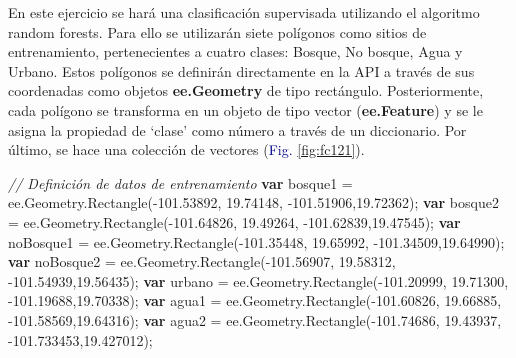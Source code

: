 \documentclass[
  12pt,
  letterpaper,
  twoside]{book}
\newenvironment{Shaded}{\begin{snugshade}}{\end{snugshade}}
\newcommand{\AttributeTok}[1]{\textcolor[rgb]{0.48,0.12,0.64}{#1}}
\newcommand{\CommentTok}[1]{\textcolor[rgb]{0.24,0.58,0.00}{\textit{#1}}}
\newcommand{\ControlFlowTok}[1]{\textcolor[rgb]{0.00,0.00,0.00}{\textbf{#1}}}
\newcommand{\FloatTok}[1]{\textcolor[rgb]{0.28,0.53,0.93}{#1}}
\newcommand{\FunctionTok}[1]{\textcolor[rgb]{0.48,0.12,0.64}{#1}}
\newcommand{\KeywordTok}[1]{\textcolor[rgb]{0.48,0.12,0.64}{#1}}
\newcommand{\NormalTok}[1]{#1}
\newcommand{\OperatorTok}[1]{\textcolor[rgb]{0.00,0.00,0.00}{#1}}
\newcommand\boldpurple[1]{\textcolor{darkpurple}{\textbf{#1}}}
\begin{document}
En este ejercicio se hará una clasificación supervisada utilizando el algoritmo random forests. Para ello se utilizarán siete polígonos como sitios de entrenamiento, pertenecientes a cuatro clases: Bosque, No bosque, Agua y Urbano. Estos polígonos se definirán directamente en la API a través de sus coordenadas como objetos \boldpurple{ee.Geometry} de tipo rectángulo. Posteriormente, cada polígono se transforma en un objeto de tipo vector (\boldpurple{ee.Feature}) y se le asigna la propiedad de `clase' como número a través de un diccionario. Por último, se hace una colección de vectores (\textcolor{darkblue}{Fig.} \ref{fig:fc121}).

\begin{Shaded}
\begin{Highlighting}[]
\CommentTok{// Definición de datos de entrenamiento}
\ControlFlowTok{var}\NormalTok{ bosque1 }\OperatorTok{=} \KeywordTok{ee}\OperatorTok{.}\AttributeTok{Geometry}\OperatorTok{.}\FunctionTok{Rectangle}\NormalTok{(}\OperatorTok{{-}}\FloatTok{101.53892}\OperatorTok{,} \FloatTok{19.74148}\OperatorTok{,} 
  \OperatorTok{{-}}\FloatTok{101.51906}\OperatorTok{,}\FloatTok{19.72362}\NormalTok{)}\OperatorTok{;}
\ControlFlowTok{var}\NormalTok{ bosque2 }\OperatorTok{=} \KeywordTok{ee}\OperatorTok{.}\AttributeTok{Geometry}\OperatorTok{.}\FunctionTok{Rectangle}\NormalTok{(}\OperatorTok{{-}}\FloatTok{101.64826}\OperatorTok{,} \FloatTok{19.49264}\OperatorTok{,} 
  \OperatorTok{{-}}\FloatTok{101.62839}\OperatorTok{,}\FloatTok{19.47545}\NormalTok{)}\OperatorTok{;}
\ControlFlowTok{var}\NormalTok{ noBosque1 }\OperatorTok{=} \KeywordTok{ee}\OperatorTok{.}\AttributeTok{Geometry}\OperatorTok{.}\FunctionTok{Rectangle}\NormalTok{(}\OperatorTok{{-}}\FloatTok{101.35448}\OperatorTok{,} \FloatTok{19.65992}\OperatorTok{,} 
  \OperatorTok{{-}}\FloatTok{101.34509}\OperatorTok{,}\FloatTok{19.64990}\NormalTok{)}\OperatorTok{;}
\ControlFlowTok{var}\NormalTok{ noBosque2 }\OperatorTok{=} \KeywordTok{ee}\OperatorTok{.}\AttributeTok{Geometry}\OperatorTok{.}\FunctionTok{Rectangle}\NormalTok{(}\OperatorTok{{-}}\FloatTok{101.56907}\OperatorTok{,} \FloatTok{19.58312}\OperatorTok{,} 
  \OperatorTok{{-}}\FloatTok{101.54939}\OperatorTok{,}\FloatTok{19.56435}\NormalTok{)}\OperatorTok{;}
\ControlFlowTok{var}\NormalTok{ urbano }\OperatorTok{=} \KeywordTok{ee}\OperatorTok{.}\AttributeTok{Geometry}\OperatorTok{.}\FunctionTok{Rectangle}\NormalTok{(}\OperatorTok{{-}}\FloatTok{101.20999}\OperatorTok{,} \FloatTok{19.71300}\OperatorTok{,} 
  \OperatorTok{{-}}\FloatTok{101.19688}\OperatorTok{,}\FloatTok{19.70338}\NormalTok{)}\OperatorTok{;}
\ControlFlowTok{var}\NormalTok{ agua1 }\OperatorTok{=} \KeywordTok{ee}\OperatorTok{.}\AttributeTok{Geometry}\OperatorTok{.}\FunctionTok{Rectangle}\NormalTok{(}\OperatorTok{{-}}\FloatTok{101.60826}\OperatorTok{,} \FloatTok{19.66885}\OperatorTok{,} 
  \OperatorTok{{-}}\FloatTok{101.58569}\OperatorTok{,}\FloatTok{19.64316}\NormalTok{)}\OperatorTok{;}
\ControlFlowTok{var}\NormalTok{ agua2 }\OperatorTok{=} \KeywordTok{ee}\OperatorTok{.}\AttributeTok{Geometry}\OperatorTok{.}\FunctionTok{Rectangle}\NormalTok{(}\OperatorTok{{-}}\FloatTok{101.74686}\OperatorTok{,} \FloatTok{19.43937}\OperatorTok{,} 
  \OperatorTok{{-}}\FloatTok{101.733453}\OperatorTok{,}\FloatTok{19.427012}\NormalTok{)}\OperatorTok{;}


\end{Highlighting}
\end{Shaded}
\end{document}
